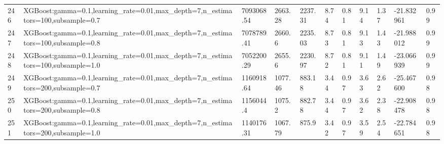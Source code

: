 \begin{longtable}{C{0.8cm} L{2cm} C{1.15cm} C{1.15cm} C{1.15cm} C{1.15cm} C{0.85cm} C{1.25cm} C{1.2cm} C{1.5cm} C{1.0cm}}
246 & XGBoost:\newline gamma=0.1,\newline learning\_rate=0.01,\newline max\_depth=7,\newline n\_estimators=100,\newline subsample=0.7 & 7093068.54 & 2663.28 & 2237.31 & 8.74 & 0.81 & 9.14 & 1.37 & -21.832961 & 0.99 \\
247 & XGBoost:\newline gamma=0.1,\newline learning\_rate=0.01,\newline max\_depth=7,\newline n\_estimators=100,\newline subsample=0.8 & 7078789.41 & 2660.6 & 2235.03 & 8.73 & 0.81 & 9.13 & 1.43 & -21.988012 & 0.99 \\
248 & XGBoost:\newline gamma=0.1,\newline learning\_rate=0.01,\newline max\_depth=7,\newline n\_estimators=100,\newline subsample=1.0 & 7052200.29 & 2655.6 & 2230.97 & 8.72 & 0.81 & 9.11 & 1.49 & -23.066939 & 0.99 \\
249 & XGBoost:\newline gamma=0.1,\newline learning\_rate=0.01,\newline max\_depth=7,\newline n\_estimators=200,\newline subsample=0.7 & 1160918.64 & 1077.46 & 883.18 & 3.44 & 0.97 & 3.63 & 2.62 & -25.467600 & 0.98 \\
250 & XGBoost:\newline gamma=0.1,\newline learning\_rate=0.01,\newline max\_depth=7,\newline n\_estimators=200,\newline subsample=0.8 & 1156044.4 & 1075.2 & 882.78 & 3.44 & 0.97 & 3.62 & 2.38 & -22.908478 & 0.98 \\
251 & XGBoost:\newline gamma=0.1,\newline learning\_rate=0.01,\newline max\_depth=7,\newline n\_estimators=200,\newline subsample=1.0 & 1140176.31 & 1067.79 & 875.9 & 3.42 & 0.97 & 3.59 & 2.54 & -22.784651 & 0.98 \\

\end{longtable}
